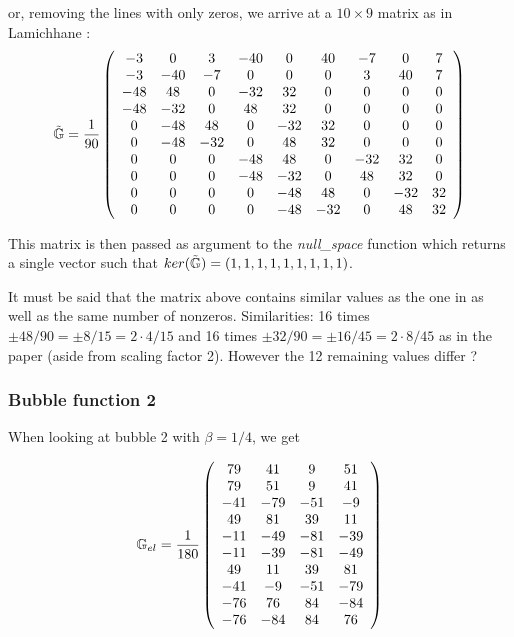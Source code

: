 or, removing the lines with only zeros, we arrive at a $10\times9$ matrix 
as in Lamichhane \cite{lami17}:
\[
\tilde{{\mathbb{G}}}
=
\frac{1}{90}
\left(
\begin{array}{ccccccccc}
 -3  &   0 &   3 & -40 &   0 &   40 &  -7 &   0 &   7 \\ 
 -3  & -40 &  -7 &   0 &   0 &    0 &   3 &  40 &   7 \\ 
-48  &  48 &   0 & -32 &  32 &    0 &   0 &   0 &   0 \\ 
-48  & -32 &   0 &  48 &  32 &    0 &   0 &   0 &   0 \\ 
  0  & -48 &  48 &   0 & -32 &   32 &   0 &   0 &   0 \\ 
  0  & -48 & -32 &   0 &  48 &   32 &   0 &   0 &   0 \\ 
  0  &   0 &   0 & -48 &  48 &    0 & -32 &  32 &   0 \\ 
  0  &   0 &   0 & -48 & -32 &    0 &  48 &  32 &   0 \\ 
  0  &   0 &   0 &   0 & -48 &   48 &   0 & -32 &  32 \\ 
  0  &   0 &   0 &   0 & -48 &  -32 &   0 &  48 &  32 
\end{array}
\right)
\] 

This matrix is then passed as argument to the {\sl null\_space} function 
which returns a single vector such that $ker(\tilde{{\mathbb{G}}})=(1,1,1,1,1,1,1,1,1)$.


It must be said that the matrix above contains similar values 
as the one in \cite{lami17}
as well as the same number of nonzeros. 
Similarities:  16 times $\pm 48/90=\pm 8/15 =2\cdot 4/15$  
and 16 times $\pm 32/90=\pm 16/45 = 2 \cdot 8/45$ as 
in the paper (aside from scaling factor 2). 
However the 12 remaining values differ ? 



\subsubsection{Bubble function 2}
When looking at bubble 2 with $\beta=1/4$, we get 

\[
{\mathbb{G}}_{el}=
\frac{1}{180}
\left(
\begin{array}{cccc}
 79&  41&   9&  51\\
 79&  51&   9&  41\\
-41& -79& -51&  -9\\
 49&  81&  39&  11\\
-11& -49& -81& -39\\
-11& -39& -81& -49\\
 49&  11&  39&  81\\
-41&  -9& -51& -79\\
-76&  76&  84& -84\\
-76& -84&  84&  76
\end{array}
\right)
\]

